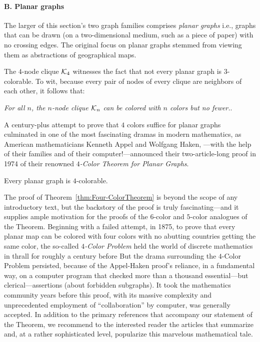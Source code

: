 \paragraph{\small\sf B. Planar graphs}

The larger of this section's two graph families comprises {\it planar
  graphs}   i.e., graphs
that can be drawn (on a two-dimensional medium, such as a piece of
paper) with no crossing edges.  The original focus on planar graphs
stemmed from viewing them as abstractions of geographical maps.

The $4$-node clique $\mbox{$\cal K$}_4$ witnesses the fact that not every planar
graph is $3$-colorable.  To wit, because every pair of nodes of every
clique are neighbors of each other, it follows that:

\smallskip

{\em For all $n$, the $n$-node clique $\mbox{$\cal K$}_n$ can be colored with $n$
  colors but no fewer.}.

\smallskip

\noindent
A century-plus attempt to prove that $4$ colors suffice for planar
graphs culminated in one of the most fascinating dramas in modern
mathematics, as American mathematicians Kenneth Appel 
and Wolfgang Haken, ---with the help of their
families and of their computer!---announced their two-article-long
proof in 1974 of their renowned {\it $4$-Color Theorem for Planar
  Graphs}.  

\begin{theorem}
\label{thm:Four-ColorTheorem}
Every planar graph is $4$-colorable.
\end{theorem}

The proof of Theorem~\ref{thm:Four-ColorTheorem} is beyond the scope
of any introductory text, but the backstory of the proof is truly
fascinating---and it supplies ample motivation for the proofs of the
$6$-color and $5$-color analogues of the Theorem.  Beginning with a
failed attempt, in 1875, to prove that every planar map can be colored
with four colors with no abutting countries getting the same color,
the so-called {\it $4$-Color Problem}
held the world of discrete mathematics in thrall for roughly a century
before But the drama surrounding the $4$-Color Problem persisted,
because of the Appel-Haken proof's reliance, in a fundamental way, on
a computer program that checked more than a thousand essential---but
clerical---assertions (about forbidden subgraphs).  It took the
mathematics community years before this proof, with its massive
complexity and unprecedented employment of ``collaboration'' by
computer, was generally accepted.  In addition to the primary
references \cite{AppelH77a,AppelH77b} that accompany our statement of
the Theorem, we recommend to the interested reader the articles
\cite{AppelH77c,AppelH89} that summarize and, at a rather
sophisticated level, popularize this marvelous mathematical tale.

